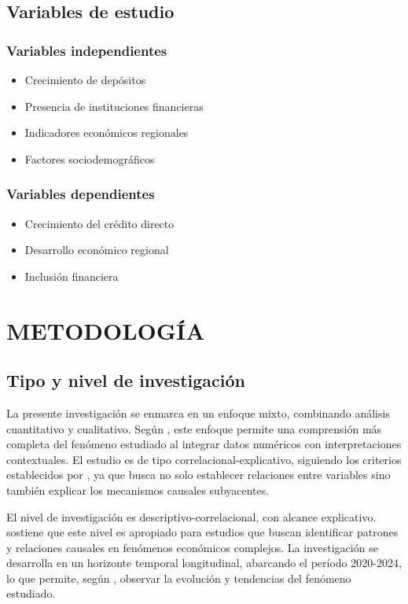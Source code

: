 \documentclass[12pt, a4paper]{article}
\begin{document}
\subsection{Variables de estudio}

\subsubsection{Variables independientes}
\begin{itemize}
    \item Crecimiento de depósitos
    \item Presencia de instituciones financieras
    \item Indicadores económicos regionales
    \item Factores sociodemográficos
\end{itemize}

\subsubsection{Variables dependientes}
\begin{itemize}
    \item Crecimiento del crédito directo
    \item Desarrollo económico regional
    \item Inclusión financiera
\end{itemize}

\section{METODOLOGÍA}

\subsection{Tipo y nivel de investigación}

La presente investigación se enmarca en un enfoque mixto, combinando análisis cuantitativo y cualitativo. Según \textcite{Hernandez2023}, este enfoque permite una comprensión más completa del fenómeno estudiado al integrar datos numéricos con interpretaciones contextuales. El estudio es de tipo correlacional-explicativo, siguiendo los criterios establecidos por \textcite{Creswell2022}, ya que busca no solo establecer relaciones entre variables sino también explicar los mecanismos causales subyacentes.

El nivel de investigación es descriptivo-correlacional, con alcance explicativo. \textcite{Kumar2024} sostiene que este nivel es apropiado para estudios que buscan identificar patrones y relaciones causales en fenómenos económicos complejos. La investigación se desarrolla en un horizonte temporal longitudinal, abarcando el período 2020-2024, lo que permite, según \textcite{Yin2023}, observar la evolución y tendencias del fenómeno estudiado.
\end{document}
